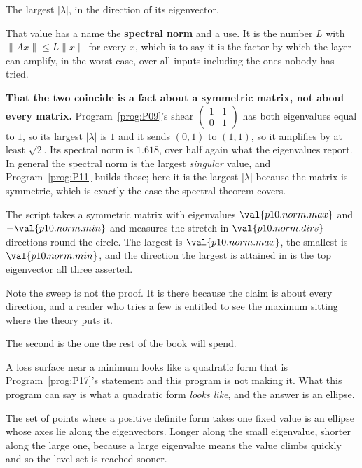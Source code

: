 \begin{fr}
\begin{ansblock}
The largest $\lvert\lambda\rvert$, in the direction of its eigenvector.
\end{ansblock}

That value has a name \dash{} the \textbf{spectral norm} \dash{} and a
use. It is the number $L$ with $\lVert Ax \rVert \le L\lVert x \rVert$ for
every $x$, which is to say it is the factor by which the layer can amplify, in
the worst case, over all inputs including the ones nobody has tried.

\begin{warning}
\textbf{That the two coincide is a fact about a symmetric matrix, not about
every matrix.} Program~\ref{prog:P09}'s shear
$\left(\begin{smallmatrix} 1 & 1 \\ 0 & 1 \end{smallmatrix}\right)$ has both
eigenvalues equal to $1$, so its largest $\lvert\lambda\rvert$ is $1$ \dash{}
and it sends $(0, 1)$ to $(1, 1)$, so it amplifies by at least $\sqrt{2}$. Its
spectral norm is $\num{1.618}$, over half again what the eigenvalues report.
In general the spectral norm is the largest \emph{singular} value, and
Program~\ref{prog:P11} builds those; here it is the largest
$\lvert\lambda\rvert$ because the matrix is symmetric, which is exactly the
case the spectral theorem covers.
\end{warning}

The script takes a symmetric matrix with eigenvalues $\val{p10.norm.max}$ and
$-\val{p10.norm.min}$ and measures the stretch in $\val{p10.norm.dirs}$
directions round the circle. The largest is $\val{p10.norm.max}$, the smallest
is $\val{p10.norm.min}$, and the direction the largest is attained in is the
top eigenvector \dash{} all three asserted.

Note the sweep is not the proof. It is there because the claim is about every
direction, and a reader who tries a few is entitled to see the maximum sitting
where the theory puts it.
\end{fr}

\begin{fr}
The second is the one the rest of the book will spend.

A loss surface near a minimum looks like a quadratic form \dash{} that is
Program~\ref{prog:P17}'s statement and this program is not making it. What this
program can say is what a quadratic form \emph{looks like}, and the answer is
an ellipse.

The set of points where a positive definite form takes one fixed value is an
ellipse whose axes lie along the eigenvectors. Longer along the small
eigenvalue, shorter along the large one, because a large eigenvalue means the
value climbs quickly and so the level set is reached sooner.
\end{fr}

